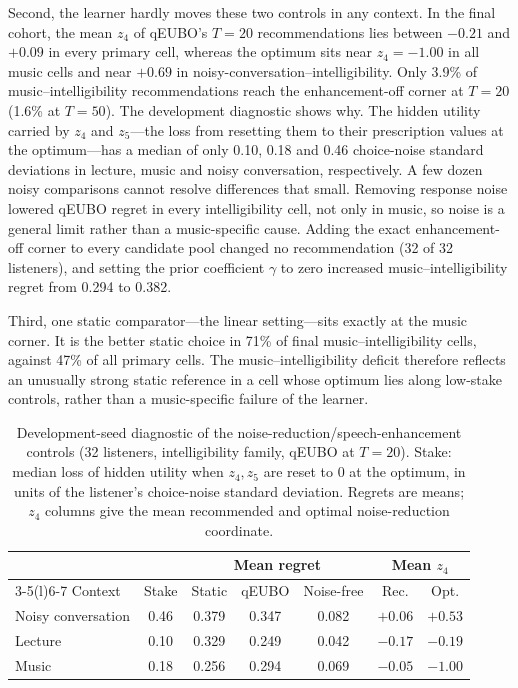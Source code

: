 \documentclass[preprint,12pt]{elsarticle}
\begin{document}
Second, the learner hardly moves these two controls in any context. In the final cohort, the mean $z_4$ of qEUBO's $T=20$ recommendations lies between $-0.21$ and $+0.09$ in every primary cell, whereas the optimum sits near $z_4=-1.00$ in all music cells and near $+0.69$ in noisy-conversation--intelligibility. Only 3.9\% of music--intelligibility recommendations reach the enhancement-off corner at $T=20$ (1.6\% at $T=50$). The development diagnostic shows why. The hidden utility carried by $z_4$ and $z_5$---the loss from resetting them to their prescription values at the optimum---has a median of only 0.10, 0.18 and 0.46 choice-noise standard deviations in lecture, music and noisy conversation, respectively. A few dozen noisy comparisons cannot resolve differences that small. Removing response noise lowered qEUBO regret in every intelligibility cell, not only in music, so noise is a general limit rather than a music-specific cause. Adding the exact enhancement-off corner to every candidate pool changed no recommendation (32 of 32 listeners), and setting the prior coefficient $\gamma$ to zero increased music--intelligibility regret from 0.294 to 0.382.

Third, one static comparator---the linear setting---sits exactly at the music corner. It is the better static choice in 71\% of final music--intelligibility cells, against 47\% of all primary cells. The music--intelligibility deficit therefore reflects an unusually strong static reference in a cell whose optimum lies along low-stake controls, rather than a music-specific failure of the learner.

\begin{table}[!htbp]
\centering
\caption{Development-seed diagnostic of the noise-reduction/speech-enhancement controls (32 listeners, intelligibility family, qEUBO at $T=20$). Stake: median loss of hidden utility when $z_4,z_5$ are reset to 0 at the optimum, in units of the listener's choice-noise standard deviation. Regrets are means; $z_4$ columns give the mean recommended and optimal noise-reduction coordinate.}
\label{tab:nrse}
\small
\begin{tabular}{@{}lcccccc@{}}
\toprule
 & & \multicolumn{3}{c}{Mean regret} & \multicolumn{2}{c}{Mean $z_4$} \\
\cmidrule(lr){3-5}\cmidrule(l){6-7}
Context & Stake & Static & qEUBO & Noise-free & Rec. & Opt. \\
\midrule
Noisy conversation & 0.46 & 0.379 & 0.347 & 0.082 & $+0.06$ & $+0.53$ \\
Lecture & 0.10 & 0.329 & 0.249 & 0.042 & $-0.17$ & $-0.19$ \\
Music & 0.18 & 0.256 & 0.294 & 0.069 & $-0.05$ & $-1.00$ \\
\bottomrule
\end{tabular}
\end{table}
\end{document}
